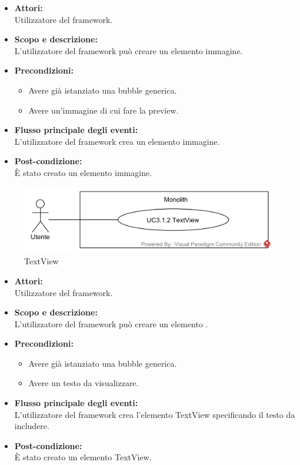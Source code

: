 \begin{itemize}
	\item \textbf{Attori:}
	\\Utilizzatore del framework.
	\item \textbf{Scopo e descrizione:} 
	\\L'utilizzatore del framework può creare un elemento immagine.
	\item \textbf{Precondizioni:}
	\begin{itemize}
		\item Avere già istanziato una bubble generica.
		\item Avere un'immagine di cui fare la preview.
	\end{itemize}
	\item \textbf{Flusso principale degli eventi:}
	\\L'utilizzatore del framework crea un elemento immagine.
	\item \textbf{Post-condizione:}
	\\È stato creato un elemento immagine.
\end{itemize}

\begin{samepage}
\nopagebreak
\begin{figure}[H]
	\centering
	\includegraphics[width=15cm]{../../documenti/AnalisiDeiRequisiti/Diagrammi_img/usecase/uc1_26.png}
	\caption{\UCFFCaption{} TextView}
\end{figure}
\end{samepage}

\begin{itemize}
	\item \textbf{Attori:}
	\\Utilizzatore del framework.
	\item \textbf{Scopo e descrizione:} 
	\\L'utilizzatore del framework può creare un elemento .
	\item \textbf{Precondizioni:}
	\begin{itemize}
		\item Avere già istanziato una bubble generica.
		\item Avere un testo da visualizzare.
	\end{itemize}
	\item \textbf{Flusso principale degli eventi:}
	\\L'utilizzatore del framework crea l'elemento TextView specificando il testo da includere.
	\item \textbf{Post-condizione:}
	\\È stato creato un elemento TextView.
\end{itemize}


